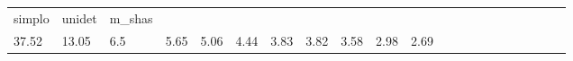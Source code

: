 \begin{table}
\begin{center}
\begin{tabular}{lllllllllllllllllllll}
    simplo
    
    
    &
    
    unidet
    
    
    &
    
    m_shas
     \\

    
    
    37.52
    
    
    &
    
    13.05
    
    
    &
    
    6.5
    
    
    &
    
    5.65
    
    
    &
    
    5.06
    
    
    &
    
    4.44
    
    
    &
    
    3.83
    
    
    &
    
    3.82
    
    
    &
    
    3.58
    
    
    &
    
    2.98
    
    
    &
    
    2.69
     \\



\end{tabular}
\end{center}
\label{T:offmetrics}
\end{table}